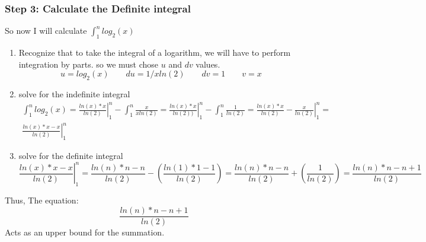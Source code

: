\documentclass[10pt,a4paper]{article}
\theoremstyle{definition}
\newcommand*\Eval[3]{\left.#1\right\rvert_{#2}^{#3}}
\begin{document}
\subsubsection{Step 3: Calculate the Definite integral}
So now I will calculate $\int_1^n log_2(x)$
\begin{enumerate}
  \item Recognize that to take the integral of a logarithm, we will have to perform integration by parts. so we must chose $u$ and $dv$ values.
  \begin{equation}
    u = log_2(x)\qquad du = 1/xln(2) \qquad dv = 1 \qquad v = x
  \end{equation}
  \item solve for the indefinite integral
  \begin{multline}
    \int_1^n log_2(x) = \Eval{\frac{ln(x)*x}{ln(2)}}{1}{n}- \int_1^n \frac{x}{xln(2)} = \Eval{\frac{ln(x)*x}{ln(2))}}{1}{n} - \int_1^n \frac{1}{ln(2)} = \Eval{\frac{ln(x)*x}{ln(2)} - \frac{x}{ln(2)}}{1}{n} = \\ \Eval{\frac{ln(x)*x-x}{ln(2)}}{1}{n}
  \end{multline}
  \item solve for the definite integral
  \begin{equation*}
    \Eval{\frac{ln(x)*x-x}{ln(2)}}{1}{n} = \frac{ln(n)*n-n}{ln(2)} - \left(\frac{ln(1)*1-1}{ln(2)}\right) = \frac{ln(n)*n-n}{ln(2)} + \left(\frac{1}{ln(2)}\right) = \frac{ln(n)*n-n + 1}{ln(2)}
  \end{equation*}
\end{enumerate}
Thus, The equation:
\begin{equation*}
  \frac{ln(n)*n-n + 1}{ln(2)}
\end{equation*}
Acts as an upper bound for the summation.
\end{document}
